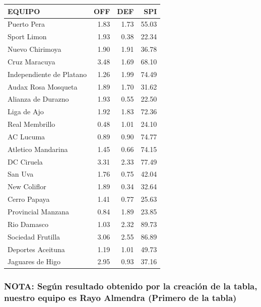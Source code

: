 \documentclass[]{article}
\begin{document}
\begin{table}[H]
\centering
\begin{tabular}{l|r|r|r}
\hline
EQUIPO & OFF & DEF & SPI\\
\hline
\rowcolor{gray!6}  Puerto Pera & 1.83 & 1.73 & 55.03\\
\hline
Sport Limon & 1.93 & 0.38 & 22.34\\
\hline
\rowcolor{gray!6}  Nuevo Chirimoya & 1.90 & 1.91 & 36.78\\
\hline
Cruz Maracuya & 3.48 & 1.69 & 68.10\\
\hline
\rowcolor{gray!6}  Independiente de  Platano & 1.26 & 1.99 & 74.49\\
\hline
Audax Rosa Mosqueta & 1.89 & 1.70 & 31.62\\
\hline
\rowcolor{gray!6}  Alianza de Durazno & 1.93 & 0.55 & 22.50\\
\hline
Liga de Ajo & 1.92 & 1.83 & 72.36\\
\hline
\rowcolor{gray!6}  Real Membrillo & 0.48 & 1.01 & 24.10\\
\hline
AC Lucuma & 0.89 & 0.90 & 74.77\\
\hline
\rowcolor{gray!6}  Atletico Mandarina & 1.45 & 0.66 & 74.15\\
\hline
DC Ciruela & 3.31 & 2.33 & 77.49\\
\hline
\rowcolor{gray!6}  San Uva & 1.76 & 0.75 & 42.04\\
\hline
New Coliflor & 1.89 & 0.34 & 32.64\\
\hline
\rowcolor{gray!6}  Cerro Papaya & 1.41 & 0.77 & 25.63\\
\hline
Provincial Manzana & 0.84 & 1.89 & 23.85\\
\hline
\rowcolor{gray!6}  Rio Damasco & 1.03 & 2.32 & 89.73\\
\hline
Sociedad Frutilla & 3.06 & 2.55 & 86.89\\
\hline
\rowcolor{gray!6}  Deportes Aceituna & 1.19 & 1.01 & 49.73\\
\hline
Jaguares de Higo & 2.95 & 0.93 & 37.16\\
\hline
\end{tabular}
\end{table}

\hypertarget{nota-segun-resultado-obtenido-por-la-creacion-de-la-tabla-nuestro-equipo-es-rayo-almendra-primero-de-la-tabla}{%
\subsubsection{\texorpdfstring{\textbf{NOTA}: Según resultado obtenido
por la creación de la tabla, nuestro equipo es \textbf{Rayo Almendra}
(Primero de la
tabla)}{NOTA: Según resultado obtenido por la creación de la tabla, nuestro equipo es Rayo Almendra (Primero de la tabla)}}\label{nota-segun-resultado-obtenido-por-la-creacion-de-la-tabla-nuestro-equipo-es-rayo-almendra-primero-de-la-tabla}}
\end{document}
